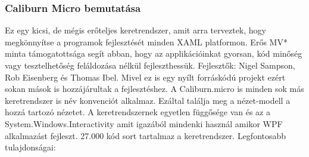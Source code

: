 \documentclass[
]{thesis-ekf}
\theoremstyle{definition}
\theoremstyle{remark}
\begin{document}
\subsubsection{Caliburn Micro bemutatása}
Ez egy kicsi, de mégis erőteljes keretrendszer, amit arra terveztek, hogy megkönnyítse a programok fejlesztését minden XAML platformon. Erős MV* minta támogatottsága segít abban, hogy az applikációinkat gyorsan, kód minőség vagy tesztelhetőség feláldozása nélkül fejleszthessük. Fejlesztők: Nigel Sampson, Rob Eisenberg és Thomas Ibel. Mivel ez is egy nyílt forráskódú projekt ezért sokan mások is hozzájárultak a fejlesztéshez. A Caliburn.micro is minden sok más keretrendszer is név konvenciót alkalmaz. Ezáltal találja meg a nézet-modell a hozzá tartozó nézetet. A keretrendszernek egyetlen függősége van és az a System.Windows.Interactivity amit igazából mindenki használ amikor WPF alkalmazást fejleszt. 27.000 kód sort tartalmaz a keretrendszer. Legfontosabb tulajdonságai: 
\end{document}
